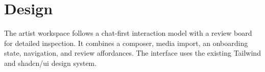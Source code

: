 \section{Design}
The artist workspace follows a chat-first interaction model with a review board for detailed inspection. It combines a composer, media import, an onboarding state, navigation, and review affordances. The interface uses the existing Tailwind and shadcn/ui design system.
